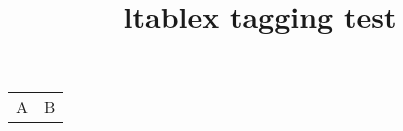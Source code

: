 \documentclass{article}
\title{ltablex tagging test}
\begin{document}
\begin{tabularx}{\linewidth}{XX}
A & B
\end{tabularx}
\end{document}
